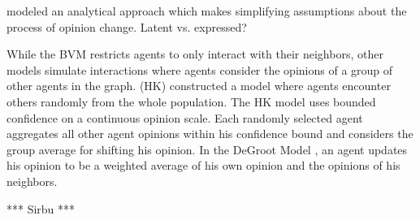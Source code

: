 \cite{friedkin_social_1990} modeled an analytical approach which makes
simplifying assumptions about the process of opinion change. Latent vs.
expressed?

While the BVM restricts agents to only interact with their neighbors, other
models simulate interactions where agents consider the opinions of a group of
other agents in the graph. \cite{hegselmann_opinion_2002} (HK) constructed a
model where agents encounter others randomly from the whole population. The HK
model uses bounded confidence on a continuous opinion scale. Each randomly
selected agent aggregates all other agent opinions within his confidence bound
and considers the group average for shifting his opinion. In the DeGroot Model
\cite{degroot_reaching_1974}, an agent updates his opinion to be a weighted
average of his own opinion and the opinions of his neighbors.
 
*** Sirbu ***





